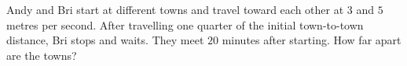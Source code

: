 Andy and Bri start at different towns and travel toward each other at $3$ and $5$ metres per second. After travelling one quarter of the initial town-to-town distance, Bri stops and waits. They meet $20$ minutes after starting. How far apart are the towns?
